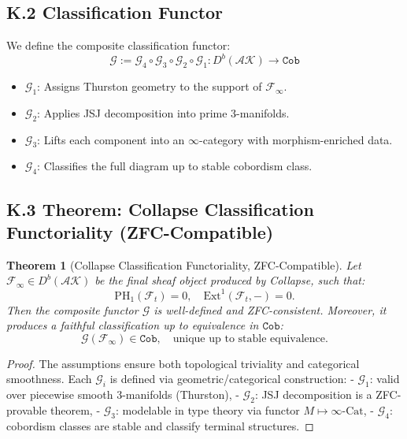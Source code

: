 \documentclass[11pt]{article}
\newtheorem{theorem}{Theorem}[section]
\begin{document}
\begin{axiom}
\begin{axiom}
\subsection*{K.2 Classification Functor}

We define the composite classification functor:
\[
\mathcal{G} := \mathcal{G}_4 \circ \mathcal{G}_3 \circ \mathcal{G}_2 \circ \mathcal{G}_1 : D^b(\mathcal{AK}) \longrightarrow \texttt{Cob}
\]
\begin{itemize}
  \item \( \mathcal{G}_1 \): Assigns Thurston geometry to the support of \( \mathcal{F}_\infty \).
  \item \( \mathcal{G}_2 \): Applies JSJ decomposition into prime 3-manifolds.
  \item \( \mathcal{G}_3 \): Lifts each component into an \( \infty \)-category with morphism-enriched data.
  \item \( \mathcal{G}_4 \): Classifies the full diagram up to stable cobordism class.
\end{itemize}

\subsection*{K.3 Theorem: Collapse Classification Functoriality (ZFC-Compatible)}

\begin{theorem}[Collapse Classification Functoriality, ZFC-Compatible]
Let \( \mathcal{F}_\infty \in D^b(\mathcal{AK}) \) be the final sheaf object produced by Collapse, such that:
\[
\mathrm{PH}_1(\mathcal{F}_t) = 0, \quad \mathrm{Ext}^1(\mathcal{F}_t, -) = 0.
\]
Then the composite functor \( \mathcal{G} \) is well-defined and ZFC-consistent.  
Moreover, it produces a faithful classification up to equivalence in \( \texttt{Cob} \):
\[
\mathcal{G}(\mathcal{F}_\infty) \in \texttt{Cob}, \quad \text{unique up to stable equivalence}.
\]
\end{theorem}

\begin{proof}
The assumptions ensure both topological triviality and categorical smoothness.  
Each \( \mathcal{G}_i \) is defined via geometric/categorical construction:
- \( \mathcal{G}_1 \): valid over piecewise smooth 3-manifolds (Thurston),
- \( \mathcal{G}_2 \): JSJ decomposition is a ZFC-provable theorem,
- \( \mathcal{G}_3 \): modelable in type theory via functor \( M \mapsto \infty\text{-Cat} \),
- \( \mathcal{G}_4 \): cobordism classes are stable and classify terminal structures.


\end{proof}
\end{axiom}
\end{axiom}
\end{document}

